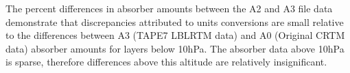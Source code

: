 The percent differences in absorber amounts between the A2 and A3 file data demonstrate that discrepancies attributed to units conversions are small relative to the differences between A3 (TAPE7 LBLRTM data) and A0 (Original CRTM data) absorber amounts for layers below 10hPa. The absorber data above 10hPa is sparse, therefore differences above this altitude are relatively insignificant. 




